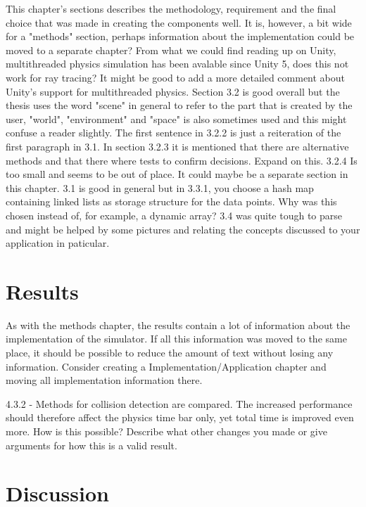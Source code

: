 \documentclass[12pt,a4paper,twoside,openright]{report}
\begin{document}
	This chapter's sections describes the methodology, requirement and the
	final choice that was made in creating the components well. It is, however,
	a bit wide for a "methods" section, perhaps information about the
	implementation could be moved to a separate chapter?  From what we could
	find reading up on Unity, multithreaded physics simulation has been
	avalable since Unity 5, does this not work for ray tracing? It might be
	good to add a more detailed comment about Unity's support for multithreaded
	physics. Section 3.2 is good overall but the thesis uses the word "scene"
	in general to refer to the part that is created by the user, "world",
	"environment" and "space" is also sometimes used and this might confuse a
	reader slightly. The first sentence in 3.2.2 is just a reiteration of the
	first paragraph in 3.1. In section 3.2.3 it is mentioned that there are
	alternative methods and that there where tests to confirm decisions. Expand
	on this.  3.2.4 Is too small and seems to be out of place.  It could maybe
	be a separate section in this chapter. 3.1 is good in general but in 3.3.1,
	you choose a hash map containing linked lists as storage structure for the
	data points. Why was this chosen instead of, for example, a dynamic array?
	3.4 was quite tough to parse and might be helped by some pictures and
	relating the concepts discussed to your application in paticular.

\section*{Results}

	As with the methods chapter, the results contain a lot of information about
	the implementation of the simulator. If all this information was moved to
	the same place, it should be possible to reduce the amount of text without
	losing any information. Consider creating a Implementation/Application 
	chapter and moving all implementation information there.
	
	4.3.2 - Methods for collision detection are compared. The increased 
	performance should therefore affect the physics time bar only, yet total 
	time is improved even more. How is this possible? Describe what other 
	changes you made or give arguments for how this is a valid result.

\section*{Discussion}
\end{document}
